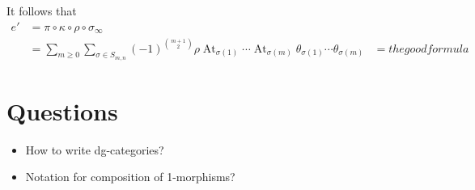 \documentclass{compositio}
\theoremstyle{definition}
\numberwithin{equation}{section}
\DeclareMathOperator{\At}{At}
\begin{document}
It follows that
\begin{align*}
e' &= \pi \circ \kappa \circ \rho \circ \sigma_\infty\\
&= \sum_{m \ge 0} \sum_{\sigma \in S_{m,n}} (-1)^{\binom{m+1}{2}} \rho \At_{\sigma(1)} \cdots \At_{\sigma(m)} \theta_{\sigma(1)} \cdots \theta_{\sigma(m)}
&= the good formula
\end{align*}

\newpage

\section{Questions}

\begin{itemize}
\item How to write dg-categories?
\item Notation for composition of 1-morphisms?
\end{itemize}
\end{document}
